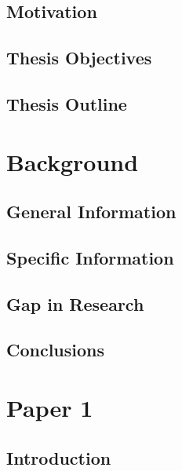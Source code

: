   \section{Motivation}\label{sec:Motivation}
    \lipsum[1-3]
  \section{Thesis Objectives}\label{sec:thesisObjective}
    \lipsum[14-16]
  \section{Thesis Outline}\label{sec:thesisOutline}
    \lipsum[17]


% 
                
\chapter{Background}\label{ch:Background}
  \section{General Information}\label{sec:}
    \lipsum[23-25]
  \section{Specific Information}\label{sec:}
    \lipsum[35-37]
  \section{Gap in Research}\label{sec:}
    \lipsum[42-43]
  \section{Conclusions}\label{sec:}
    \lipsum[12-13]

\chapter{Paper 1}\label{ch:Paper1}
  \section{Introduction}\label{sec:}
    \lipsum[34-36]
